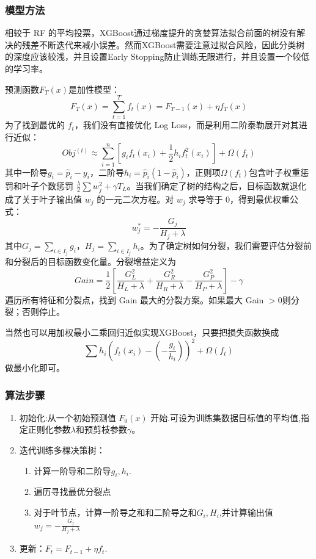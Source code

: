 \documentclass[11pt, a4paper]{article}
\begin{document}
\subsubsection{模型方法}
相较于 RF 的平均投票，XGBoost通过梯度提升的贪婪算法拟合前面的树没有解决的残差不断迭代来减小误差。然而XGBoost需要注意过拟合风险，因此分类树的深度应该较浅，并且设置Early Stopping防止训练无限进行，并且设置一个较低的学习率。

预测函数$F_T(x)$是加性模型：
$$F_T(x) = \sum_{t=1}^{T} f_t(x) = F_{T-1}(x) + \eta f_T(x)$$
为了找到最优的 $f_t$，我们没有直接优化 Log Loss，而是利用二阶泰勒展开对其进行近似：
$$Obj^{(t)} \approx \sum_{i=1}^n \left[ g_i f_t(x_i) + \frac{1}{2}h_i f_t^2(x_i) \right] + \Omega(f_t)$$
其中一阶导$g_i=\hat{p}_i - y_i$，二阶导$h_i=\hat{p}_i(1-\hat{p}_i)$，正则项$\Omega(f_t)$包含叶子权重惩罚和叶子个数惩罚 $\frac{\lambda}{2} \sum w_j^2+\gamma T_L$。当我们确定了树的结构之后，目标函数就退化成了关于叶子输出值 $w_j$ 的一元二次方程。对 $w_j$ 求导等于 0，得到最优权重公式：$$w_j^* = -\frac{G_j}{H_j + \lambda}$$其中$G_j = \sum_{i \in I_j} g_i$，$H_j = \sum_{i \in I_j} h_i$。为了确定树如何分裂，我们需要评估分裂前和分裂后的目标函数变化量。分裂增益定义为$$Gain = \frac{1}{2} \left[ \frac{G_L^2}{H_L+\lambda} + \frac{G_R^2}{H_R+\lambda} - \frac{G_P^2}{H_P+\lambda} \right] - \gamma$$遍历所有特征和分裂点，找到 Gain 最大的分裂方案。如果最大 Gain $> 0$则分裂；否则停止。

当然也可以用加权最小二乘回归近似实现XGBoost，只要把损失函数换成
$$\sum h_i \left( f_t(x_i) - \left( -\frac{g_i}{h_i} \right) \right)^2 + \Omega(f_t)$$
做最小化即可。
\subsubsection{算法步骤}
\begin{enumerate}
    \item 初始化:从一个初始预测值 \(F_{0}(x)\) 开始.可设为训练集数据目标值的平均值,指定正则化参数$\lambda$和预剪枝参数$\gamma$。
    \item 迭代训练多棵决策树：\begin{enumerate}
        \item 计算一阶导和二阶导$g_i,h_i$.
        \item 遍历寻找最优分裂点
        \item 对于叶节点，计算一阶导之和和二阶导之和$G_i,H_i$,并计算输出值$w_j = -\frac{G_j}{H_j + \lambda}$
    \end{enumerate}
    \item 更新：$F_t = F_{t-1} + \eta f_t$.
\end{enumerate}
\end{document}
